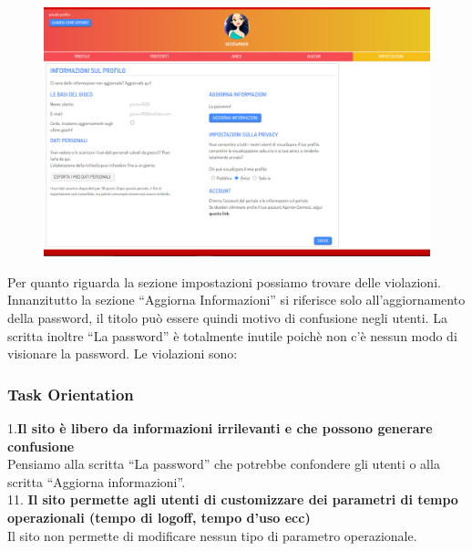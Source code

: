 \documentclass[../Report.tex]{subfiles}
\begin{document}
    \begin{figure}[H]
        \includegraphics[width=\linewidth]{Assestment17.png}
        \centering
    \end{figure}

    Per quanto riguarda la sezione impostazioni possiamo trovare delle violazioni.
    Innanzitutto la sezione “Aggiorna Informazioni” si riferisce solo all’aggiornamento della password, il titolo può essere quindi motivo di confusione negli utenti. La scritta inoltre “La password” è totalmente inutile poichè non c’è nessun modo di visionare la password.
    Le violazioni sono:

    \subsubsection{Task Orientation}
    1.\textbf{Il sito è libero da informazioni irrilevanti e che possono generare confusione}\\
	Pensiamo alla scritta “La password” che potrebbe confondere gli utenti o alla scritta “Aggiorna informazioni”.\\
    
    11.\textbf{  Il sito permette agli utenti di customizzare dei parametri di tempo operazionali (tempo di logoff, tempo d’uso ecc)}\\
    Il sito non permette di modificare nessun tipo di parametro operazionale. \\
\end{document}

